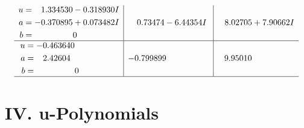\documentclass[1p]{elsarticle_modified}
\theoremstyle{definition}
\begin{document}
$$\begin{array}{c|c|c}
\begin{aligned}
u &= \phantom{-}1.334530 - 0.318930 I \\
a &= -0.370895 + 0.073482 I \\
b &= \phantom{-0.000000 } 0\end{aligned}
 & \phantom{-}0.73474 - 6.44354 I & \phantom{-}8.02705 + 7.90662 I \\ \hline\begin{aligned}
u &= -0.463640\phantom{ +0.000000I} \\
a &= \phantom{-}2.42604\phantom{ +0.000000I} \\
b &= \phantom{-0.000000 } 0\end{aligned}
 & -0.799899\phantom{ +0.000000I} & \phantom{-}9.95010\phantom{ +0.000000I}\\
 \hline 
 \end{array}$$\newpage
\newpage\renewcommand{\arraystretch}{1}
\centering \section*{ IV. u-Polynomials}
\end{document}

